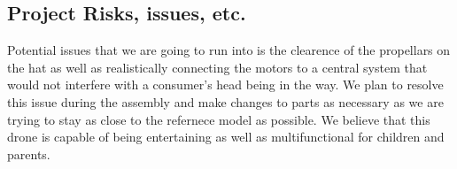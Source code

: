 \subsection{Project Risks, issues, etc.}

    Potential issues that we are going to run into is the clearence of the propellars on the hat as well as realistically connecting the motors to a central system that would not interfere with a consumer's head being in the way. We plan to resolve this issue during the assembly and make changes to parts as necessary as we are trying to stay as close to the refernece model as possible. We believe that this drone is capable of being entertaining as well as multifunctional for children and parents.